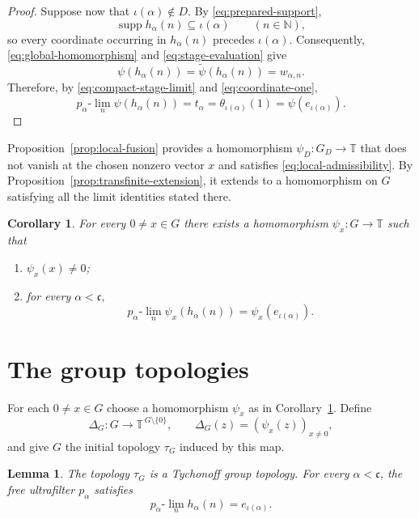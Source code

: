 \documentclass[11pt]{amsart}
\newtheorem{corollary}[theorem]{Corollary}
\newtheorem{lemma}[theorem]{Lemma}
\theoremstyle{definition}
\newcommand{\T}{\mathbb T}
\newcommand{\N}{\mathbb N}
\newcommand{\cfrak}{\mathfrak c}
\newcommand{\supp}{\operatorname{supp}}
\begin{document}
\begin{proof}
Suppose now that $\iota(\alpha)\notin D$.  By
\eqref{eq:prepared-support},
\[
 \supp h_\alpha(n)\subseteq\iota(\alpha)
 \qquad(n\in\N),
\]
so every coordinate occurring in $h_\alpha(n)$ precedes
$\iota(\alpha)$.  Consequently, \eqref{eq:global-homomorphism} and
\eqref{eq:stage-evaluation} give
\[
 \psi(h_\alpha(n))
 =\widetilde\psi(h_\alpha(n))
 =w_{\alpha,n}.
\]
Therefore, by \eqref{eq:compact-stage-limit} and
\eqref{eq:coordinate-one},
\[
 p_\alpha\text{-}\lim_n\psi(h_\alpha(n))
 =t_\alpha
 =\theta_{\iota(\alpha)}(1)
 =\psi(e_{\iota(\alpha)}).
\]
\end{proof}

Proposition~\ref{prop:local-fusion} provides a homomorphism
$\psi_D:G_D\to\T$ that does not vanish at the chosen nonzero vector $x$ and
satisfies \eqref{eq:local-admissibility}.  By
Proposition~\ref{prop:transfinite-extension}, it extends to a homomorphism on
$G$ satisfying all the limit identities stated there.

\begin{corollary}\label{cor:admissible-homomorphisms}
For every $0\neq x\in G$ there exists a homomorphism
$\psi_x:G\to\T$ such that
\begin{enumerate}
\item\label{item:detect-x} $\psi_x(x)\neq0$;
\item\label{item:all-admissible} for every $\alpha<\cfrak$,
\[
 p_\alpha\text{-}\lim_n\psi_x(h_\alpha(n))
 =\psi_x(e_{\iota(\alpha)}).
\]
\end{enumerate}
\end{corollary}

\section{The group topologies}\label{sec:group-topologies}

For each $0\neq x\in G$ choose a homomorphism $\psi_x$ as in
Corollary~\ref{cor:admissible-homomorphisms}.  Define
\[
 \Delta_G:G\longrightarrow
 \T^{\,G\setminus\{0\}},
 \qquad
 \Delta_G(z)=(\psi_x(z))_{x\neq0},
\]
and give $G$ the initial topology $\tau_G$ induced by this map.

\begin{lemma}\label{lem:initial-topology}
The topology $\tau_G$ is a Tychonoff group topology.  For
every $\alpha<\cfrak$, the free ultrafilter $p_\alpha$ satisfies
\begin{equation}\label{eq:group-ultrafilter-limit}
 p_\alpha\text{-}\lim_n h_\alpha(n)=e_{\iota(\alpha)}.
\end{equation}
\end{lemma}
\end{document}
